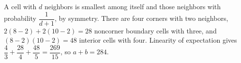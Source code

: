 A cell with $d$ neighbors is smallest among itself and those neighbors with probability $\dfrac{1}{d+1}$, by symmetry. There are four corners with two neighbors, $2(8-2)+2(10-2)=28$ noncorner boundary cells with three, and $(8-2)(10-2)=48$ interior cells with four. Linearity of expectation gives $\dfrac{4}{3}+\dfrac{28}{4}+\dfrac{48}{5}=\dfrac{269}{15}$, so $\boxed{a+b=284}$.
